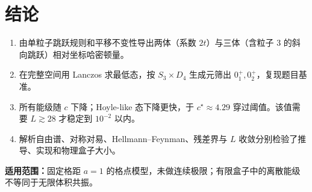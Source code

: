 \documentclass[UTF8,fontset=fandol,11pt,a4paper]{ctexart}
\begin{document}
\section{结论}
\begin{enumerate}
\item 由单粒子跳跃规则和平移不变性导出两体（系数 $2t$）与三体（含粒子 3 的斜向跳跃）相对坐标哈密顿量。
\item 在完整空间用 Lanczos 求最低态，按 $S_3\times D_4$ 生成元筛出 $0^+_1,0^+_2$，复现题目基准。
\item 所有能级随 $c$ 下降；Hoyle-like 态下降更快，于 $c^\star\approx4.29$ 穿过阈值。该值需要 $L\gtrsim28$ 才稳定到 $10^{-2}$ 以内。
\item 解析自由谱、对称对易、Hellmann--Feynman、残差界与 $L$ 收敛分别检验了推导、实现和物理盒子大小。
\end{enumerate}
\textbf{适用范围：}固定格距 $a=1$ 的格点模型，未做连续极限；有限盒子中的离散能级不等同于无限体积共振。
\end{document}
